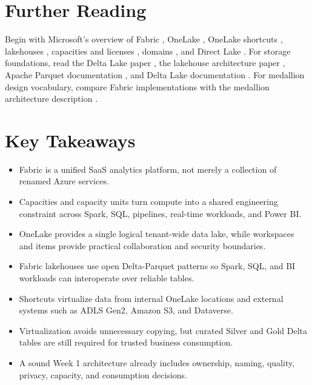 \section{Further Reading}
Begin with Microsoft's overview of Fabric \cite{microsoftFabricOverview}, OneLake \cite{microsoftOneLakeOverview}, OneLake shortcuts \cite{microsoftOneLakeShortcuts}, lakehouses \cite{microsoftFabricLakehouse}, capacities and licenses \cite{microsoftFabricCapacity}, domains \cite{microsoftDomains}, and Direct Lake \cite{microsoftDirectLake}. For storage foundations, read the Delta Lake paper \cite{armbrust2020delta}, the lakehouse architecture paper \cite{armbrust2021lakehouse}, Apache Parquet documentation \cite{apacheParquet}, and Delta Lake documentation \cite{deltaLakeDocs}. For medallion design vocabulary, compare Fabric implementations with the medallion architecture description \cite{databricksMedallion}.

\section*{Key Takeaways}
\begin{itemize}
    \item Fabric is a unified SaaS analytics platform, not merely a collection of renamed Azure services.
    \item Capacities and capacity units turn compute into a shared engineering constraint across Spark, SQL, pipelines, real-time workloads, and Power BI.
    \item OneLake provides a single logical tenant-wide data lake, while workspaces and items provide practical collaboration and security boundaries.
    \item Fabric lakehouses use open Delta-Parquet patterns so Spark, SQL, and BI workloads can interoperate over reliable tables.
    \item Shortcuts virtualize data from internal OneLake locations and external systems such as ADLS Gen2, Amazon S3, and Dataverse.
    \item Virtualization avoids unnecessary copying, but curated Silver and Gold Delta tables are still required for trusted business consumption.
    \item A sound Week 1 architecture already includes ownership, naming, quality, privacy, capacity, and consumption decisions.
\end{itemize}

